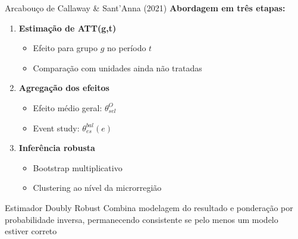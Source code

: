 \documentclass[10pt,aspectratio=169]{beamer}
\begin{document}
\begin{frame}{Arcabouço de Callaway \& Sant'Anna (2021)}
\textbf{Abordagem em três etapas:}

\begin{enumerate}
    \item \textbf{Estimação de ATT(g,t)}
    \begin{itemize}
        \item Efeito para grupo $g$ no período $t$
        \item Comparação com unidades ainda não tratadas
    \end{itemize}
    
    \item \textbf{Agregação dos efeitos}
    \begin{itemize}
        \item Efeito médio geral: $\theta_{sel}^O$
        \item Event study: $\theta_{es}^{bal}(e)$
    \end{itemize}
    
    \item \textbf{Inferência robusta}
    \begin{itemize}
        \item Bootstrap multiplicativo
        \item Clustering ao nível da microrregião
    \end{itemize}
\end{enumerate}

\begin{block}{Estimador Doubly Robust}
Combina modelagem do resultado e ponderação por probabilidade inversa, permanecendo consistente se pelo menos um modelo estiver correto
\end{block}
\end{frame}
\end{document}
